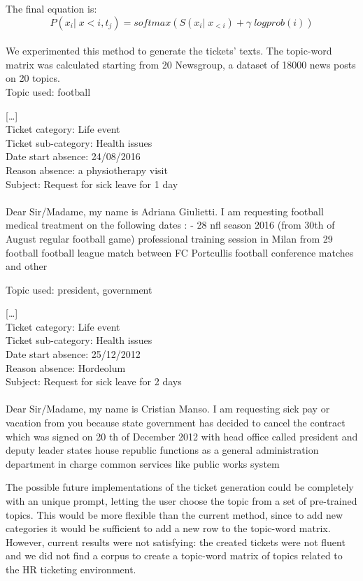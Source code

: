 The final equation is:
\begin{equation*}
    P(x_i|\;x{<i},t_j) = softmax(S(x_i|\;x_{<i}) + \gamma\;logprob(i))
\end{equation*}
\\
We experimented this method to generate the tickets' texts. The topic-word matrix was calculated starting from 20 Newsgroup, a dataset of 18000 news posts on 20 topics. \\

Topic used: football
\begin{adjustwidth}{1cm}{}
    [\dots] \\
    Ticket category: Life event\\
    Ticket sub-category: Health issues\\
    Date start absence: 24/08/2016\\
    Reason absence: a physiotherapy visit\\
    Subject: Request for sick leave for 1 day\\\\
    Dear Sir/Madame, my name is Adriana Giulietti. I am requesting football medical treatment on the following dates : - 28 nfl season 2016 (from 30th of August regular football game) professional training session in Milan from 29 football football league match between FC Portcullis football conference matches and other 
\end{adjustwidth}

Topic used: president, government
\begin{adjustwidth}{1cm}{}
    [\dots] \\
    Ticket category: Life event\\
    Ticket sub-category: Health issues\\
    Date start absence: 25/12/2012\\
    Reason absence: Hordeolum\\
    Subject: Request for sick leave for 2 days\\\\
    Dear Sir/Madame, my name is Cristian Manso. I am requesting sick pay or vacation from you because state government has decided to cancel the contract which was signed on 20 th of 
    December 2012 with head office called president and deputy leader states house republic functions as a general administration department in charge common services like public works system
    \end{adjustwidth}

    

The possible future implementations of the ticket generation could be completely with an unique prompt, letting the user choose the topic from a set of pre-trained topics. This would be more flexible than the current method, since to add new categories it would be sufficient to add a new row to the topic-word matrix. \\
However, current results were not satisfying: the created tickets were not fluent and we did not find a corpus to create a topic-word matrix of topics related to the HR ticketing environment.

